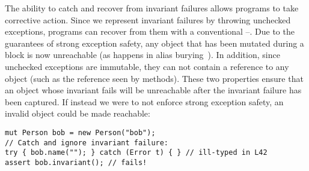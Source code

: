 %
%
%

The ability to catch and recover from invariant failures allows programs to take corrective action.
Since we represent invariant failures by throwing unchecked exceptions, programs can recover from them with a conventional \Q@try@--\Q@catch@.
	Due to the guarantees of strong exception safety, any object that has been mutated during a \Q@try@ block is now unreachable (as happens in alias burying~\cite{boyland2001alias}). In addition, since unchecked exceptions are immutable, they can not contain a \Q@read@ reference to any object (such as the \Q@this@ reference seen by \Q@invariant@ methods). These two properties ensure that an object whose invariant fails will be unreachable after the invariant failure has been captured. %
If instead we were to not enforce strong exception safety, an invalid object could be made reachable:
\begin{lstlisting}[morekeywords={assert}]
mut Person bob = new Person("bob");
// Catch and ignore invariant failure:
try { bob.name(""); } catch (Error t) { } // ill-typed in L42
assert bob.invariant(); // fails!
\end{lstlisting}

